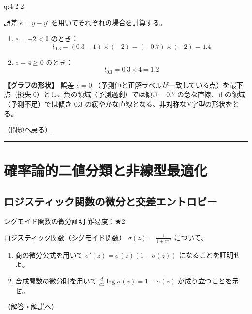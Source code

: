 \begin{answerbox}[phantomlabel=a:4-2-2]{q:4-2-2}

誤差 \(e = y - y'\) を用いてそれぞれの場合を計算する。

\begin{enumerate}
\def\labelenumi{\arabic{enumi}.}
\tightlist
\item
  \(e = -2 < 0\) のとき： \[
       l_{0.3} = (0.3 - 1) \times (-2) = (-0.7) \times (-2) = 1.4
       \]
\item
  \(e = 4 \ge 0\) のとき： \[
       l_{0.3} = 0.3 \times 4 = 1.2
       \]
\end{enumerate}

\textbf{【グラフの形状】} 誤差 \(e=0\)
（予測値と正解ラベルが一致している点）を最下点（損失
\(0\)）とし、負の領域（予測過剰）では傾き \(-0.7\)
の急な直線、正の領域（予測不足）では傾き \(0.3\)
の緩やかな直線となる、非対称なV字型の形状をとる。

\hfill 

\hyperref[q:4-2-2]{（問題へ戻る）}

\begin{center}\rule{0.5\linewidth}{0.5pt}\end{center}

\end{answerbox}

\section{確率論的二値分類と非線型最適化}\label{ux78baux7387ux8ad6ux7684ux4e8cux5024ux5206ux985eux3068ux975eux7ddaux578bux6700ux9069ux5316}

\subsection{ロジスティック関数の微分と交差エントロピー}\label{ux30edux30b8ux30b9ux30c6ux30a3ux30c3ux30afux95a2ux6570ux306eux5faeux5206ux3068ux4ea4ux5deeux30a8ux30f3ux30c8ux30edux30d4ux30fc}

\begin{questionbox}[label=q:5-1-1]{シグモイド関数の微分証明 \hfill \normalfont \small 難易度：★2}

ロジスティック関数（シグモイド関数）
\(\sigma(z) = \frac{1}{1 + e^{-z}}\) について、

\begin{enumerate}
\def\labelenumi{\arabic{enumi}.}
\tightlist
\item
  商の微分公式を用いて \(\sigma'(z) = \sigma(z)(1 - \sigma(z))\)
  になることを証明せよ。
\item
  合成関数の微分則を用いて
  \(\frac{d}{dz} \log \sigma(z) = 1 - \sigma(z)\) が成り立つことを示せ。
\end{enumerate}

\hfill 

\hyperref[a:5-1-1]{（解答・解説へ）}

\end{questionbox}

